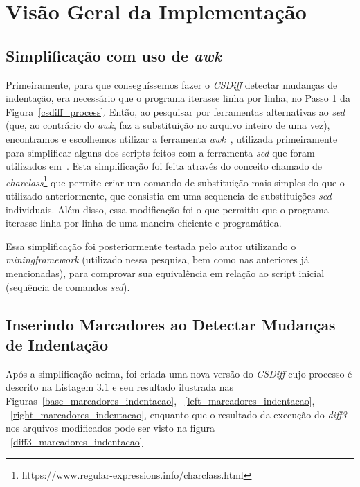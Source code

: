 \section{Visão Geral da Implementação}\label{implementacao}
\subsection{Simplificação com uso de \emph{awk}}

Primeiramente, para que conseguíssemos fazer o \emph{CSDiff} detectar mudanças
de indentação, era necessário que o programa iterasse linha por linha, no Passo
1 da Figura~\ref{csdiff_process}. Então, ao pesquisar por ferramentas
alternativas ao \emph{sed} (que, ao contrário do \emph{awk}, faz a substituição
no arquivo inteiro de uma vez), encontramos e escolhemos utilizar a ferramenta
\emph{awk}~\cite{awk}, utilizada primeiramente para simplificar alguns dos
scripts feitos com a ferramenta \emph{sed} que foram utilizados
em~\cite{clem21,heitor21}. Esta simplificação foi feita através do conceito
chamado de
\emph{charclass}\footnote{https://www.regular-expressions.info/charclass.html}
que permite criar um comando de substituição mais simples do que o utilizado
anteriormente, que consistia em uma sequencia de substituições \emph{sed}
individuais. Além disso, essa modificação foi o que permitiu que o programa
iterasse linha por linha de uma maneira eficiente e programática.

Essa simplificação foi posteriormente testada pelo autor utilizando o
\emph{miningframework} (utilizado nessa pesquisa, bem como nas anteriores já
mencionadas), para comprovar sua equivalência em relação ao script inicial
(sequência de comandos \emph{sed}).

\subsection{Inserindo Marcadores ao Detectar Mudanças de Indentação}

Após a simplificação acima, foi criada uma nova versão do \emph{CSDiff} cujo
processo é descrito na Listagem 3.1 e seu resultado
ilustrada nas Figuras~\ref{base_marcadores_indentacao},
~\ref{left_marcadores_indentacao}, ~\ref{right_marcadores_indentacao}, enquanto
que o resultado da execução do \emph{diff3} nos arquivos modificados pode
ser visto na figura ~\ref{diff3_marcadores_indentacao}

